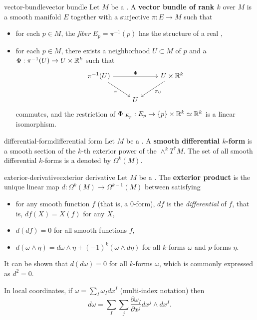 \begin{topic}{vector-bundle}{vector bundle}
    Let $M$ be a . A \textbf{vector bundle of rank $k$} over $M$ is a smooth manifold $E$ together with a surjective  $\pi : E \to M$ such that
    \begin{itemize}
        \item for each $p \in M$, the \textit{fiber} $E_p = \pi^{-1}(p)$ has the structure of a real ,
        \item for each $p \in M$, there exists a neighborhood $U \subset M$ of $p$ and a  $\Phi : \pi^{-1}(U) \to U \times \mathbb{R}^k$ such that
        \[ \begin{tikzcd} \pi^{-1}(U) \arrow{rr}{\Phi} \arrow[swap]{dr}{\pi} && U \times \RR^k \arrow{dl}{\pi_U} \\ & U & \end{tikzcd} \]
        commutes, and the restriction of $\Phi|_{E_p} : E_p \to \{ p \} \times \mathbb{R}^k \simeq \mathbb{R}^k$ is a linear isomorphism.
    \end{itemize}
\end{topic}

\begin{topic}{differential-form}{differential form}
    Let $M$ be a . A \textbf{smooth differential $k$-form} is a smooth section of the $k$-th exterior power of the  $\wedge^k T^* M$. The set of all smooth differential $k$-forms is a  denoted by $\Omega^k(M)$.
\end{topic}

\begin{topic}{exterior-derivative}{exterior derivative}
    Let $M$ be a . The \textbf{exterior product} is the unique linear map $d : \Omega^k(M) \to \Omega^{k - 1}(M)$ between  satisfying
    \begin{itemize}
        \item for any smooth function $f$ (that is, a $0$-form), $df$ is the \textit{differential} of $f$, that is, $df(X) = X(f)$ for any  $X$,
        \item $d(df) = 0$ for all smooth functions $f$,
        \item $d(\omega \wedge \eta) = d \omega \wedge \eta + (-1)^k (\omega \wedge d\eta)$ for all $k$-forms $\omega$ and $p$-forms $\eta$.
    \end{itemize}
    It can be shown that $d(d\omega) = 0$ for all $k$-forms $\omega$, which is commonly expressed as $d^2 = 0$.
    
    In local coordinates, if $\omega = \sum_I \omega_I dx^I$ (multi-index notation) then
    \[ d \omega = \sum_I \sum_j \frac{\partial \omega_I}{\partial x^j} dx^j \wedge dx^I . \]
\end{topic}

